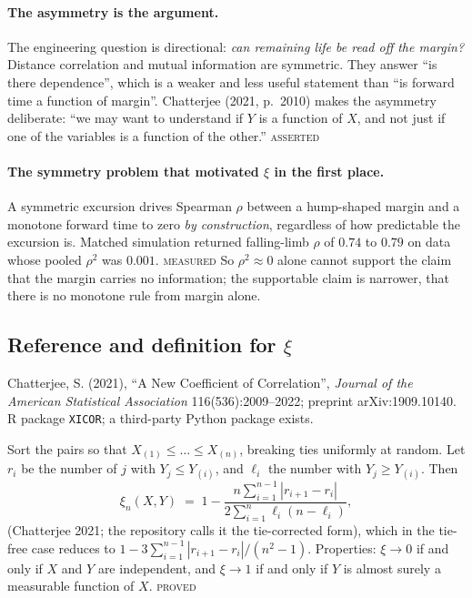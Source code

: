 \documentclass[11pt,a4paper]{article}
\newcommand{\PROVED}{\textsc{\textcolor{blue!55!black}{proved}}}
\newcommand{\ASSERTED}{\textsc{\textcolor{purple!70!black}{asserted}}}
\newcommand{\MEASURED}{\textsc{\textcolor{green!45!black}{measured}}}
\begin{document}
\paragraph{The asymmetry is the argument.} The engineering question is directional:
\emph{can remaining life be read off the margin?} Distance correlation and mutual
information are symmetric. They answer \enquote{is there dependence}, which is a weaker
and less useful statement than \enquote{is forward time a function of margin}. Chatterjee
(2021, p.~2010) makes the asymmetry deliberate:
\enquote{we may want to understand if $Y$ is a function of $X$, and not just if one of the
variables is a function of the other.} \ASSERTED

\paragraph{The symmetry problem that motivated $\xi$ in the first place.} A symmetric
excursion drives Spearman $\rho$ between a hump-shaped margin and a monotone forward time
to zero \emph{by construction}, regardless of how predictable the excursion is. Matched
simulation returned falling-limb $\rho$ of $0.74$ to $0.79$ on data whose pooled $\rho^2$
was $0.001$. \MEASURED{} So $\rho^2 \approx 0$ alone cannot support the claim that the
margin carries no information; the supportable claim is narrower, that there is no
monotone rule from margin alone.

\subsection{Reference and definition for \texorpdfstring{$\xi$}{xi}}

Chatterjee, S. (2021), \enquote{A New Coefficient of Correlation}, \emph{Journal of the
American Statistical Association} 116(536):2009--2022; preprint arXiv:1909.10140.
R package \texttt{XICOR}; a third-party Python package exists.

Sort the pairs so that $X_{(1)} \le \dots \le X_{(n)}$, breaking ties uniformly at
random. Let $r_i$ be the number of $j$ with $Y_j \le Y_{(i)}$, and $\ell_i$ the number
with $Y_j \ge Y_{(i)}$. Then
%
\begin{equation}
\xi_n(X,Y) \;=\; 1 - \frac{n \sum_{i=1}^{n-1} |r_{i+1} - r_i|}
{2 \sum_{i=1}^{n} \ell_i (n - \ell_i)} ,
\label{eq:xi}
\end{equation}
%
(Chatterjee 2021; the repository calls it the tie-corrected form), which in the
tie-free case reduces to
$1 - 3\sum_{i=1}^{n-1}|r_{i+1}-r_i| / (n^2-1)$.
Properties: $\xi \to 0$ if and only if $X$ and $Y$ are independent, and $\xi \to 1$ if
and only if $Y$ is almost surely a measurable function of $X$. \PROVED
\end{document}

